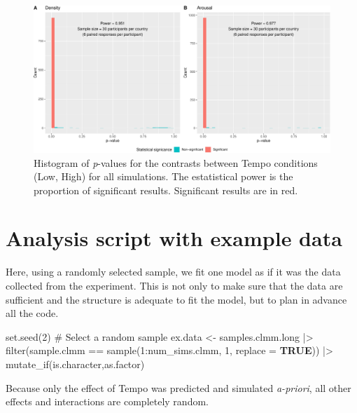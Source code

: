 \documentclass[
  bookmarksnumbered]{article}
\newenvironment{Shaded}{\begin{snugshade}}{\end{snugshade}}
\newcommand{\AttributeTok}[1]{\textcolor[rgb]{0.80,0.80,0.80}{#1}}
\newcommand{\CommentTok}[1]{\textcolor[rgb]{0.50,0.62,0.50}{#1}}
\newcommand{\ConstantTok}[1]{\textcolor[rgb]{0.86,0.64,0.64}{\textbf{#1}}}
\newcommand{\DecValTok}[1]{\textcolor[rgb]{0.86,0.86,0.80}{#1}}
\newcommand{\FunctionTok}[1]{\textcolor[rgb]{0.94,0.94,0.56}{#1}}
\newcommand{\NormalTok}[1]{\textcolor[rgb]{0.80,0.80,0.80}{#1}}
\newcommand{\OtherTok}[1]{\textcolor[rgb]{0.94,0.94,0.56}{#1}}
\newcommand{\SpecialCharTok}[1]{\textcolor[rgb]{0.86,0.64,0.64}{#1}}
\begin{document}
\begin{figure}
\centering
\includegraphics{Power_analysis_files/figure-latex/unnamed-chunk-15-1.pdf}
\caption{\label{fig:unnamed-chunk-15}Histogram of \emph{p}-values for the contrasts between Tempo conditions (Low, High) for all simulations. The estatistical power is the proportion of significant results. Significant results are in red.}
\end{figure}

\hypertarget{example-data}{%
\section{Analysis script with example data}\label{example-data}}

Here, using a randomly selected sample, we fit one model as if it was the data collected from the experiment. This is not only to make sure that the data are sufficient and the structure is adequate to fit the model, but to plan in advance all the code.

\begin{Shaded}
\begin{Highlighting}[]
\FunctionTok{set.seed}\NormalTok{(}\DecValTok{2}\NormalTok{)}
\CommentTok{\# Select a random sample}
\NormalTok{ex.data }\OtherTok{\textless{}{-}}\NormalTok{ samples.clmm.long  }\SpecialCharTok{|\textgreater{}} 
  \FunctionTok{filter}\NormalTok{(sample.clmm }\SpecialCharTok{==} \FunctionTok{sample}\NormalTok{(}\DecValTok{1}\SpecialCharTok{:}\NormalTok{num\_sims.clmm, }\DecValTok{1}\NormalTok{, }\AttributeTok{replace =} \ConstantTok{TRUE}\NormalTok{)) }\SpecialCharTok{|\textgreater{}} 
  \FunctionTok{mutate\_if}\NormalTok{(is.character,as.factor)}
\end{Highlighting}
\end{Shaded}

Because only the effect of Tempo was predicted and simulated \emph{a-priori}, all other effects and interactions are completely random.
\end{document}
